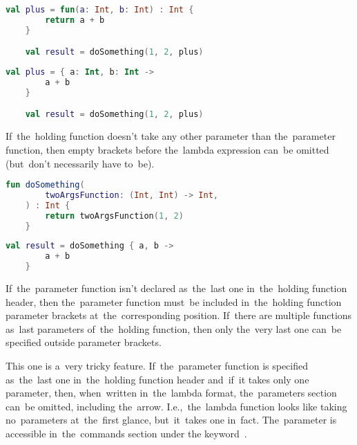 \begin{lstlisting}[language=Kotlin, title={Equivalent with anonymous function in a variable -- parameter types must be used}]
    val plus = fun(a: Int, b: Int) : Int {
        return a + b
    }

    val result = doSomething(1, 2, plus)
\end{lstlisting}
\begin{lstlisting}[language=Kotlin, title={Equivalent with lambda function in a variable -- parameter types must be used}]
    val plus = { a: Int, b: Int ->
        a + b
    }

    val result = doSomething(1, 2, plus)
\end{lstlisting}
\newline

\noindent If~the~holding function doesn't take any other parameter than the~parameter function, then empty brackets before the~lambda expression can~be omitted (but~don't necessarily have \mbox{to be).}

\example
\begin{lstlisting}[language=Kotlin, title={Function taking other function as the~only parameter}]
    fun doSomething(
        twoArgsFunction: (Int, Int) -> Int,
    ) : Int {
        return twoArgsFunction(1, 2)
    }
\end{lstlisting}
\begin{lstlisting}[language=Kotlin, title={Usage}]
    val result = doSomething { a, b ->
        a + b
    }
\end{lstlisting}
\newline

\noindent If~the~parameter function isn't declared as~the~last one in~the~holding function header, then the~parameter function must~be included in~the~holding function parameter brackets at~the~corresponding position.
If~there are multiple functions as~last parameters of~the~holding function, then only the~very last one can~be specified outside parameter brackets.
\newpage

This one is a~very tricky feature.
If~the~parameter function is specified as~the~last one in~the~holding function header and~if~it takes only one parameter, then, when~written in~the~lambda format, the~parameters section can~be omitted, including the~arrow.
I.e.,~the~lambda function looks like taking no~parameters at~the~first glance, but~it~takes one in~fact.
The~parameter is accessible in~the~commands section under the keyword~.

